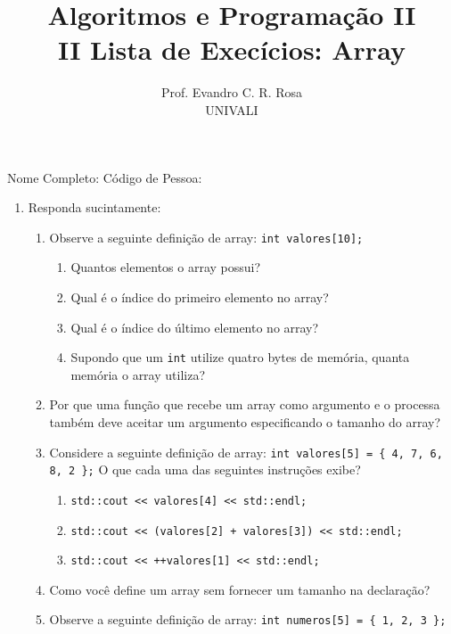 \documentclass[12pt]{article}
\title{Algoritmos e Programação II\\
\large II Lista de Execícios: Array}
\author{Prof. Evandro C. R. Rosa\\UNIVALI}
\date{}
\begin{document}
\maketitle

\noindent Nome Completo: \underline{\hspace{8cm}} Código de Pessoa: \underline{\hspace{2.4cm}}

\begin{enumerate}
      \item Responda sucintamente:
            \begin{enumerate}
                  \item Observe a seguinte definição de array: \texttt{int valores[10];}
                        \begin{enumerate}
                              \item Quantos elementos o array possui?
                              \item Qual é o índice do primeiro elemento no array?
                              \item Qual é o índice do último elemento no array?
                              \item Supondo que um \texttt{int} utilize quatro bytes de memória, quanta memória o array utiliza?
                        \end{enumerate}
                  \item Por que uma função que recebe um array como argumento e o processa também deve aceitar um argumento especificando o tamanho do array?
                  \item Considere a seguinte definição de array: \texttt{int valores[5] = \{ 4, 7, 6, 8, 2 \};} O que cada uma das seguintes instruções exibe?
                        \begin{enumerate}
                              \item \texttt{std::cout << valores[4] << std::endl;}
                              \item \texttt{std::cout << (valores[2] + valores[3]) << std::endl;}
                              \item \texttt{std::cout << ++valores[1] << std::endl;}
                        \end{enumerate}
                  \item Como você define um array sem fornecer um tamanho na declaração?
                  \item Observe a seguinte definição de array: \texttt{int numeros[5] = \{ 1, 2, 3 \};}

\end{enumerate}
\end{enumerate}
\end{document}
